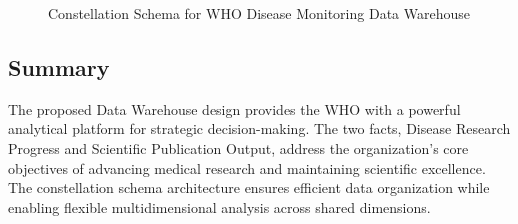 \documentclass[11pt,a4paper]{article}
\begin{document}
\begin{figure}[H]
  \centering
  \caption{Constellation Schema for WHO Disease Monitoring Data Warehouse}
  \label{fig:dw-schema}
\end{figure}

\subsection{Summary}

The proposed Data Warehouse design provides the WHO with a powerful analytical platform for strategic decision-making. The two facts, Disease Research Progress and Scientific Publication Output, address the organization's core objectives of advancing medical research and maintaining scientific excellence. The constellation schema architecture ensures efficient data organization while enabling flexible multidimensional analysis across shared dimensions.
\end{document}
